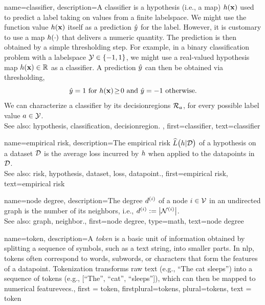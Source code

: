 {name={classifier},
	description={A classifier is a \gls{hypothesis} (i.e., a \gls{map}) $h({\bf x})$ 
		used to predict a \gls{label} taking on values from a finite \gls{labelspace}. We might use the 
		\gls{function} value $h({\bf x})$ itself as a \gls{prediction} $\hat{y}$ for 
		the \gls{label}. However, it is customary to use a \gls{map} $h(\cdot)$ that delivers 
		a numeric quantity. The \gls{prediction} is then obtained by a simple thresholding step. 
		For example, in a binary \gls{classification} problem with a \gls{labelspace} $\mathcal{Y} \in  \{ -1,1\}$, 
		we might use a real-valued \gls{hypothesis} \gls{map} $h({\bf x}) \in \mathbb{R}$ 
		as a classifier. A \gls{prediction} $\hat{y}$ can then be obtained via thresholding,  
		 \begin{equation} 
		 	\label{equ_def_threshold_bin_classifier_dict}
		 	\hat{y} =1   \mbox{ for } h({\bf x})\!\geq\!0 \mbox{ and } 	\hat{y} =-1  \mbox{ otherwise.}
	 		\end{equation}
 		We can characterize a classifier by its \glspl{decisionregion} $\mathcal{R}_{a}$, for 
 		every possible \gls{label} value $a \in \mathcal{Y}$.
					\\ 
		See also: \gls{hypothesis}, \gls{classification}, \gls{decisionregion}. },
	first={classifier},
	text={classifier} 
}

{name={empirical risk},
  description={The empirical \gls{risk} $\widehat{L}\big(h|\mathcal{D}\big)$ 
  	of a \gls{hypothesis} on a \gls{dataset} $\mathcal{D}$ is the average \gls{loss} incurred 
  	by $h$ when applied to the \glspl{datapoint} in $\mathcal{D}$.
				\\ 
		See also: \gls{risk}, \gls{hypothesis}, \gls{dataset}, \gls{loss}, \gls{datapoint}.},
  first={empirical risk},
  text={empirical risk} 
}

{name={node degree},
	description={The degree $d^{(i)}$ of a 
	node $i \in \mathcal{V}$ in an undirected \gls{graph} is the 
	number of its \glspl{neighbor}, i.e., $d^{(i)} := \big|\mathcal{N}^{(i)}\big|$.
					\\ 
		See also: \gls{graph}, \gls{neighbor}.},
	first={node degree},
	type=math, 
	text={node degree} 
}

{name={token},
 description={A \textit{token} is a basic unit of information 
  obtained by splitting a sequence of symbols, such as a text string, 
  into smaller parts. In \gls{nlp}, tokens often correspond to words, subwords, 
  or characters that form the \glspl{feature} of a \gls{datapoint}. 
  Tokenization transforms raw text (e.g., ``The cat sleeps'') into a 
  sequence of tokens (e.g., [``The'', ``cat'', ``sleeps'']), which can
  then be mapped to numerical \glspl{featurevec}.}, 
  first = {token}, 
  firstplural={tokens}, 
  plural={tokens}, 
  text = {token}
}

